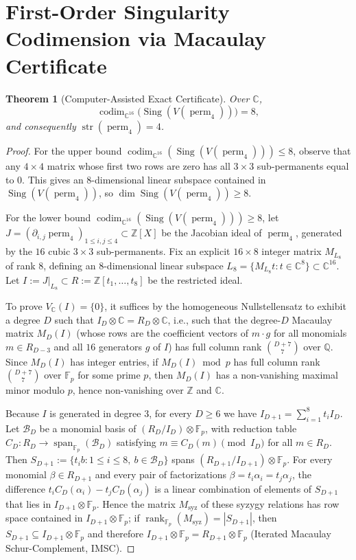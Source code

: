 \documentclass[11pt,a4paper]{article}
\newtheorem{theorem}{Theorem}[section]
\theoremstyle{definition}
\DeclareMathOperator{\perm}{perm}
\DeclareMathOperator{\codim}{codim}
\DeclareMathOperator{\Sing}{Sing}
\DeclareMathOperator{\rank}{rank}
\DeclareMathOperator{\str}{str}
\DeclareMathOperator{\Span}{span}
\begin{document}
\section{First-Order Singularity Codimension via Macaulay Certificate}\label{sec:cert}

\begin{theorem}[Computer-Assisted Exact Certificate]\label{thm:sing1}
Over $\mathbb{C}$,
\[
  \codim_{\mathbb{C}^{16}}\big(\Sing(V(\perm_4))\big) = 8,
\]
and consequently $\str(\perm_4) = 4$.
\end{theorem}

\begin{proof}
For the upper bound $\codim_{\mathbb{C}^{16}}(\Sing(V(\perm_4))) \le 8$, observe that any $4 \times 4$ matrix whose first two rows are zero has all $3 \times 3$ sub-permanents equal to $0$. This gives an $8$-dimensional linear subspace contained in $\Sing(V(\perm_4))$, so $\dim \Sing(V(\perm_4)) \ge 8$.

For the lower bound $\codim_{\mathbb{C}^{16}}(\Sing(V(\perm_4))) \ge 8$, let $J = (\partial_{i,j}\perm_4)_{1\le i,j\le 4} \subset \mathbb{Z}[X]$ be the Jacobian ideal of $\perm_4$, generated by the $16$ cubic $3 \times 3$ sub-permanents. Fix an explicit $16 \times 8$ integer matrix $M_{L_8}$ of rank $8$, defining an $8$-dimensional linear subspace $L_8 = \{M_{L_8} t : t \in \mathbb{C}^8\} \subset \mathbb{C}^{16}$. Let $I := J|_{L_8} \subset R := \mathbb{Z}[t_1,\dots,t_8]$ be the restricted ideal.

To prove $V_{\mathbb{C}}(I) = \{0\}$, it suffices by the homogeneous Nullstellensatz to exhibit a degree $D$ such that $I_D \otimes \mathbb{C} = R_D \otimes \mathbb{C}$, i.e., such that the degree-$D$ Macaulay matrix $M_D(I)$ (whose rows are the coefficient vectors of $m \cdot g$ for all monomials $m \in R_{D-3}$ and all $16$ generators $g$ of $I$) has full column rank $\binom{D+7}{7}$ over $\mathbb{Q}$. Since $M_D(I)$ has integer entries, if $M_D(I) \bmod p$ has full column rank $\binom{D+7}{7}$ over $\mathbb{F}_p$ for some prime $p$, then $M_D(I)$ has a non-vanishing maximal minor modulo $p$, hence non-vanishing over $\mathbb{Z}$ and $\mathbb{C}$.

Because $I$ is generated in degree $3$, for every $D \ge 6$ we have $I_{D+1} = \sum_{i=1}^8 t_i I_D$. Let $\mathcal{B}_D$ be a monomial basis of $(R_D / I_D) \otimes \mathbb{F}_p$, with reduction table $C_D : R_D \to \Span_{\mathbb{F}_p}(\mathcal{B}_D)$ satisfying $m \equiv C_D(m) \pmod{I_D}$ for all $m \in R_D$. Then $S_{D+1} := \{t_i b : 1 \le i \le 8,\ b \in \mathcal{B}_D\}$ spans $(R_{D+1}/I_{D+1}) \otimes \mathbb{F}_p$. For every monomial $\beta \in R_{D+1}$ and every pair of factorizations $\beta = t_i \alpha_i = t_j \alpha_j$, the difference $t_i C_D(\alpha_i) - t_j C_D(\alpha_j)$ is a linear combination of elements of $S_{D+1}$ that lies in $I_{D+1} \otimes \mathbb{F}_p$. Hence the matrix $M_{\mathrm{syz}}$ of these syzygy relations has row space contained in $I_{D+1} \otimes \mathbb{F}_p$; if $\rank_{\mathbb{F}_p}(M_{\mathrm{syz}}) = |S_{D+1}|$, then $S_{D+1} \subseteq I_{D+1} \otimes \mathbb{F}_p$ and therefore $I_{D+1} \otimes \mathbb{F}_p = R_{D+1} \otimes \mathbb{F}_p$ (Iterated Macaulay Schur-Complement, IMSC).


\end{proof}
\end{document}
